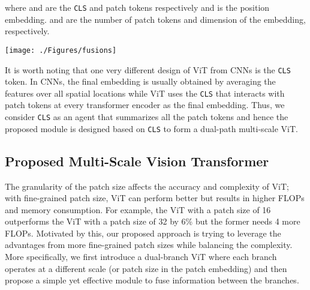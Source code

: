 \documentclass[10pt,twocolumn,letterpaper]{article}
\def\clstoken{\texttt{CLS}\xspace}
\begin{document}
where  and  are the \clstoken and patch tokens respectively and  is the position embedding.  and  are the number of patch tokens and dimension of the embedding, respectively. 


\begin{figure*}[tbh!]
    \centering
    \texttt{[image: ./Figures/fusions]}
\caption{\textbf{Multi-scale fusion}. 
    (a) All-attention fusion where all tokens are bundled together without considering any characteristic of tokens. 
    (b) Class token fusion, where only \clstoken tokens are fused as it can be considered as global representation of one branch. (c) Pairwise fusion, where tokens at the corresponding spatial locations are fused together and \clstoken are fused separately. (d) Cross-attention, where \clstoken token from one branch and patch tokens from another branch are fused together. 
    }
    \label{fig:fusions} 
\end{figure*}

It is worth noting that one very different design of ViT from CNNs is the \clstoken token. In CNNs, the final embedding is usually obtained by averaging the features over all spatial locations while ViT uses the \clstoken that interacts with patch tokens at every transformer encoder as the final embedding. Thus, we consider \clstoken as an agent that summarizes all the patch tokens and hence the proposed module is designed based on \clstoken to form a dual-path multi-scale ViT.

\subsection{Proposed Multi-Scale Vision Transformer}
\label{subsec:crossvit_overview}
The granularity of the patch size affects the accuracy and complexity of ViT; with fine-grained patch size, ViT can perform better but results in higher FLOPs and memory consumption. For example, the ViT with a patch size of 16 outperforms the ViT with a  patch size of 32 by 6\% but the former needs 4 more FLOPs. Motivated by this, our proposed approach is trying to leverage the advantages from more fine-grained patch sizes while balancing the complexity. More specifically, we first introduce a dual-branch ViT where each branch operates at a different scale (or patch size in the patch embedding) and then propose a simple yet effective module to fuse information between the branches.
\end{document}
